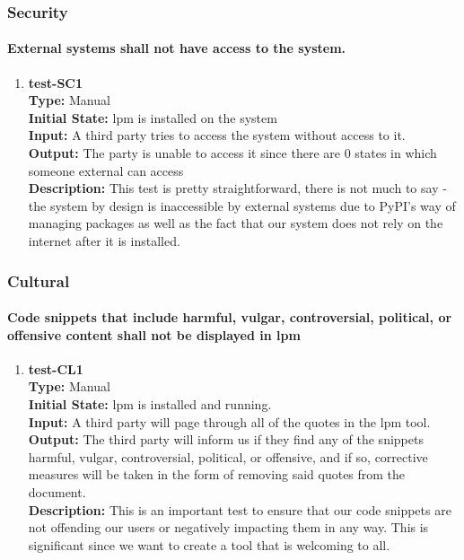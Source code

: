 \documentclass[12pt, titlepage]{article}
\begin{document}
\subsubsection{Security}
\paragraph{External systems shall not have access to the system.}
\begin{enumerate}
    \item{\textbf{test-SC1}\\}
    \textbf{Type:} Manual\\
    \textbf{Initial State:} lpm is installed on the system \\
    \textbf{Input:} A third party tries to access the system without access to it.\\
    \textbf{Output:} The party is unable to access it since there are 0 states in which someone external can access \\
    \textbf{Description:} This test is pretty straightforward, there is not much to say - the system by design is inaccessible by external systems due to PyPI's way of managing packages as well as the fact that our system does not rely on the internet after it is installed.\\
\end{enumerate}

\subsubsection{Cultural}
\paragraph{Code snippets that include harmful, vulgar, controversial, political, or offensive
content shall not be displayed in lpm}
\begin{enumerate}
    \item{\textbf{test-CL1}\\}
    \textbf{Type:} Manual\\
    \textbf{Initial State:} lpm is installed and running.\\
    \textbf{Input:} A third party will page through all of the quotes in the lpm tool.\\
    \textbf{Output:} The third party will inform us if they find any of the snippets harmful, vulgar, controversial, political, or offensive, and if so, corrective measures will be taken in the form of removing said quotes from the document. \\
    \textbf{Description:} This is an important test to ensure that our code snippets are not offending our users or negatively impacting them in any way. This is significant since we want to create a tool that is welcoming to all.\\
\end{enumerate}
\end{document}
